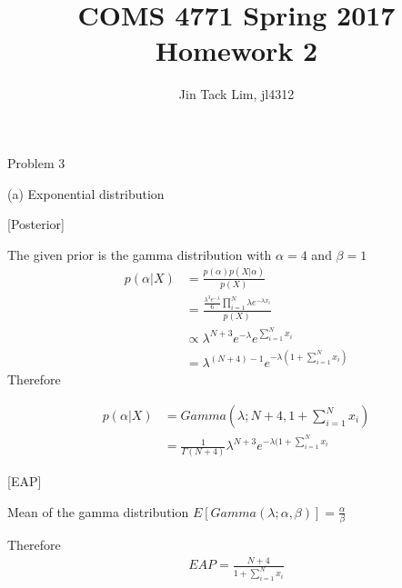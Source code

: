 \documentclass[11pt]{article}
\title{COMS 4771 Spring 2017 Homework 2}
\author{Jin Tack Lim, jl4312
  }
\date{%
  }
\theoremstyle{definition}
\begin{document}
\maketitle



\newcommand{\gau}[3]{
$\frac{1}{{ \sqrt {2\pi #3 ^2} }}e^{ \frac { - \left( {#1 - #2 } \right)^2 } {2#3 ^2}}$
}

\newcommand{\gauraw}[3]{
\frac{1}{{ \sqrt {2\pi #3 ^2} }}e^{ \frac { - \left( {#1 - #2 } \right)^2 } {2#3 ^2}}
}


Problem 3

(a) Exponential distribution

[Posterior]

The given prior is the gamma distribution with $\alpha = 4$ and $\beta = 1$
\begin{equation*}
\begin{split}
 p(\alpha | X ) & =  \frac{p(\alpha)p(X|\alpha)}{p(X)} \\
 & = \frac{\frac{\lambda^3 e^{-\lambda}}{6} \prod_{i=1}^{N} \lambda e^{-\lambda x_i}} {p(X)} \\
 & \propto {\lambda^{N+3} e^{-\lambda} e^{\sum_{i=1}^{N} x_i}} \\
 & = {\lambda^{(N+4) -1} e^{-\lambda(1+\sum_{i=1}^{N} x_i)} } 
\end{split}
\end{equation*}
Therefore

\begin{equation*}
\begin{split}
 p(\alpha | X ) & =  Gamma(\lambda; N+4, 1+\sum_{i=1}^{N} x_i)  \\
& = \frac{1}{\Gamma(N+4)} \lambda^{N+3} e^{-\lambda(1+\sum_{i=1}^{N} x_i}
\end{split}
\end{equation*}


[EAP]

Mean of the gamma distribution $E[Gamma(\lambda;\alpha, \beta)] = \frac{\alpha}{\beta}$

Therefore
\begin{equation*}
\begin{split}
EAP = \frac{N+4}{1+\sum_{i=1}^{N} x_i}
\end{split}
\end{equation*}
\end{document}
